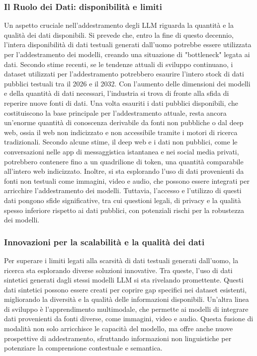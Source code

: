 \documentclass[target=mst,aauheader=,style=]{thud}
\begin{document}
\subsubsection{Il Ruolo dei Dati: disponibilità e limiti}
Un aspetto cruciale nell'addestramento degli LLM riguarda la quantità e la qualità dei dati disponibili. Si prevede che, entro la fine di questo decennio, l’intera disponibilità di dati testuali generati dall’uomo potrebbe essere utilizzata per l'addestramento dei modelli, creando una situazione di "bottleneck" legata ai dati. Secondo stime recenti, se le tendenze attuali di sviluppo continuano, i dataset utilizzati per l’addestramento potrebbero esaurire l'intero stock di dati pubblici testuali tra il 2026 e il 2032.
Con l'aumento delle dimensioni dei modelli e della quantità di dati necessari, l’industria si trova di fronte alla sfida di reperire nuove fonti di dati. Una volta esauriti i dati pubblici disponibili, che costituiscono la base principale per l'addestramento attuale, resta ancora un'enorme quantità di conoscenza derivabile da fonti non pubbliche o dal deep web, ossia il web non indicizzato e non accessibile tramite i motori di ricerca tradizionali. Secondo alcune stime, il deep web e i dati non pubblici, come le conversazioni nelle app di messaggistica istantanea e nei social media privati, potrebbero contenere fino a un quadrilione di token, una quantità comparabile all'intero web indicizzato. Inoltre, si sta esplorando l'uso di dati provenienti da fonti non testuali come immagini, video e audio, che possono essere integrati per arricchire l'addestramento dei modelli. Tuttavia, l’accesso e l’utilizzo di questi dati pongono sfide significative, tra cui questioni legali, di privacy e la qualità spesso inferiore rispetto ai dati pubblici, con potenziali rischi per la robustezza dei modelli.

\subsubsection{Innovazioni per la scalabilità e la qualità dei dati}
Per superare i limiti legati alla scarsità di dati testuali generati dall’uomo, la ricerca sta esplorando diverse soluzioni innovative. Tra queste, l’uso di dati sintetici generati dagli stessi modelli LLM si sta rivelando promettente. Questi dati sintetici possono essere creati per coprire gap specifici nei dataset esistenti, migliorando la diversità e la qualità delle informazioni disponibili. Un’altra linea di sviluppo è l’apprendimento multimodale, che permette ai modelli di integrare dati provenienti da fonti diverse, come immagini, video e audio. Questa fusione di modalità non solo arricchisce le capacità del modello, ma offre anche nuove prospettive di addestramento, sfruttando informazioni non linguistiche per potenziare la comprensione contestuale e semantica.
\end{document}
